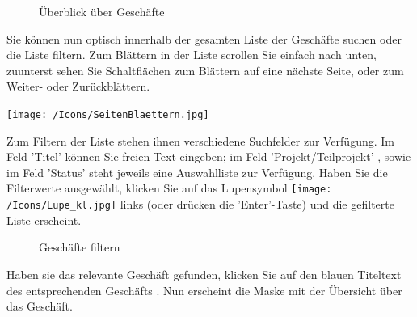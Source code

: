 \begin{figure}[H]
\caption{Überblick über Geschäfte}
\end{figure}

Sie können nun optisch innerhalb der gesamten Liste der Geschäfte suchen oder die Liste filtern. Zum Blättern in der Liste scrollen Sie einfach nach unten, zuunterst sehen Sie Schaltflächen zum Blättern auf eine nächste Seite, oder zum Weiter- oder Zurückblättern.

\begin{center}
\texttt{[image: /Icons/SeitenBlaettern.jpg]}
\end{center}

Zum Filtern der Liste stehen ihnen verschiedene Suchfelder zur Verfügung. Im Feld 'Titel'  können Sie freien Text eingeben; im Feld 'Projekt/Teilprojekt' , sowie im Feld 'Status'  steht jeweils eine Auswahlliste zur Verfügung. Haben Sie die Filterwerte ausgewählt, klicken Sie auf das Lupensymbol \texttt{[image: /Icons/Lupe\_kl.jpg]}  links (oder drücken die 'Enter'-Taste) und die gefilterte Liste erscheint.

\begin{figure}[H]
\caption{Geschäfte filtern}
\end{figure}

Haben sie das relevante Geschäft gefunden, klicken Sie auf den blauen Titeltext des entsprechenden Geschäfts . Nun erscheint die Maske mit der Übersicht über das Geschäft.

